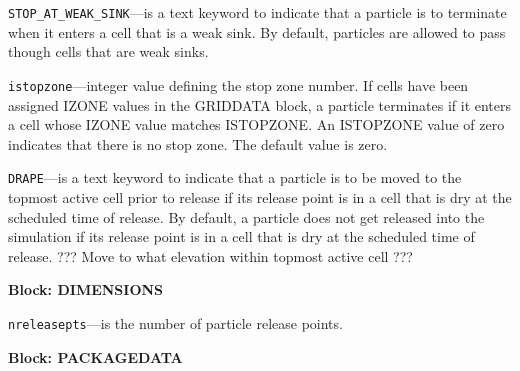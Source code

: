 \begin{description}
\item \texttt{STOP\_AT\_WEAK\_SINK}---is a text keyword to indicate that a particle is to terminate when it enters a cell that is a weak sink.  By default, particles are allowed to pass though cells that are weak sinks.

\item \texttt{istopzone}---integer value defining the stop zone number.  If cells have been assigned IZONE values in the GRIDDATA block, a particle terminates if it enters a cell whose IZONE value matches ISTOPZONE.  An ISTOPZONE value of zero indicates that there is no stop zone.  The default value is zero.

\item \texttt{DRAPE}---is a text keyword to indicate that a particle is to be moved to the topmost active cell prior to release if its release point is in a cell that is dry at the scheduled time of release.  By default, a particle does not get released into the simulation if its release point is in a cell that is dry at the scheduled time of release.  ??? Move to what elevation within topmost active cell ???

\end{description}
\item \textbf{Block: DIMENSIONS}

\begin{description}
\item \texttt{nreleasepts}---is the number of particle release points.

\end{description}
\item \textbf{Block: PACKAGEDATA}

